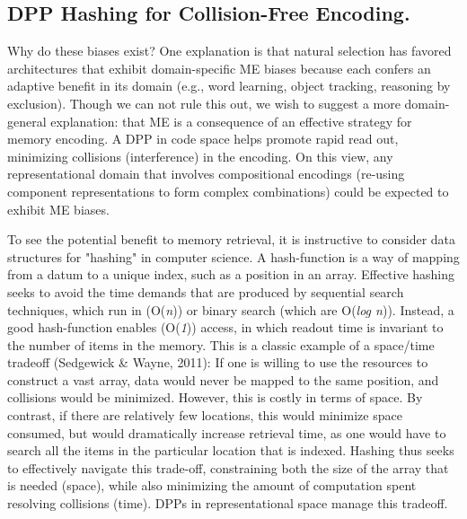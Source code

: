 \documentclass[10pt,letterpaper]{article}
\begin{document}
\subsection{DPP Hashing for Collision-Free Encoding.}

Why do these biases exist? One explanation is that natural selection has favored architectures that exhibit domain-specific ME biases because each confers an adaptive benefit in its domain (e.g., word learning, object tracking, reasoning by exclusion). Though we can not rule this out, we wish to suggest a more domain-general explanation: that ME is a consequence of an effective strategy for memory encoding. A DPP in code space helps promote rapid read out, minimizing collisions (interference) in the encoding. On this view, any representational domain that involves compositional encodings (re-using component representations to form complex combinations) could be expected to exhibit ME biases. 

To see the potential benefit to memory retrieval, it is instructive to consider data structures for "hashing" in computer science. A hash-function is a way of mapping from a datum to a unique index, such as a position in an array. Effective hashing seeks to avoid the time demands that are produced by sequential search techniques, which run in (O(\textit{n})) or binary search (which are O(\textit{log n})). Instead, a good hash-function enables (O(\textit{1})) access, in which readout time is invariant to  the number of items in the memory. This is a classic example of a space/time tradeoff (Sedgewick \& Wayne, 2011): If one is willing to use the resources to construct a vast array, data would never be mapped to the same position, and collisions would be minimized. However, this is costly in terms of space. By contrast, if there are relatively few locations, this would minimize space consumed, but would dramatically increase retrieval time, as one would have to search all the items in the particular location that is indexed. Hashing thus seeks to effectively navigate this trade-off, constraining both the size of the array that is needed (space), while also minimizing the amount of computation spent resolving collisions (time). DPPs in representational space manage this tradeoff.
\end{document}
